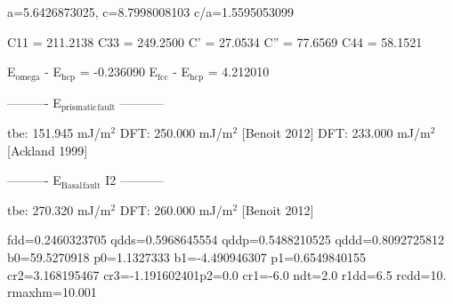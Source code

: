 \documentclass[11pt]{article}
\begin{document}
a=5.6426873025, c=8.7998008103 c/a=1.5595053099

C11 = 211.2138
C33 = 249.2500
C'  =  27.0534
C'' =  77.6569
C44 =  58.1521

E\(_{\text{omega}}\) - E\(_{\text{hcp}}\) = -0.236090
E\(_{\text{fcc}}\) - E\(_{\text{hcp}}\) =  4.212010

----------     E\(_{\text{prismatic}}\)\(_{\text{fault}}\)     -----------

tbe:       151.945 mJ/m\(^{\text{2}}\)
DFT:       250.000 mJ/m\(^{\text{2}}\) [Benoit  2012]
DFT:       233.000 mJ/m\(^{\text{2}}\) [Ackland 1999]

----------     E\(_{\text{Basal}}\)\(_{\text{fault}}\) I2     -----------

tbe:       270.320 mJ/m\(^{\text{2}}\)
DFT:       260.000 mJ/m\(^{\text{2}}\) [Benoit  2012]



fdd=0.2460323705 qdds=0.5968645554 qddp=0.5488210525 qddd=0.8092725812 b0=59.5270918 p0=1.1327333 b1=-4.490946307 p1=0.6549840155 cr2=3.168195467 cr3=-1.191602401p2=0.0 cr1=-6.0 ndt=2.0 r1dd=6.5 rcdd=10. rmaxhm=10.001 
\end{document}
